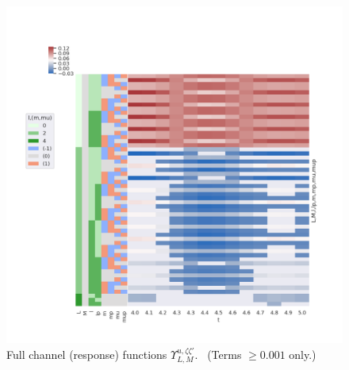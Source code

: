 \documentclass[10pt]{article}
\begin{document}
\begin{figure}[]
\begin{center}
\includegraphics[width=\textwidth,height=\dimexpr\textheight-4\baselineskip-\abovecaptionskip-\belowcaptionskip\relax,keepaspectratio]{figures/basisPlots_090822_response_M0.png}
\caption{Full channel (response) functions \(\varUpsilon_{L,M}^{u,\zeta\zeta'}\).     (Terms \(\ge0.001\) only.)\label{676540}}
\end{center}
\end{figure}








\end{document}
